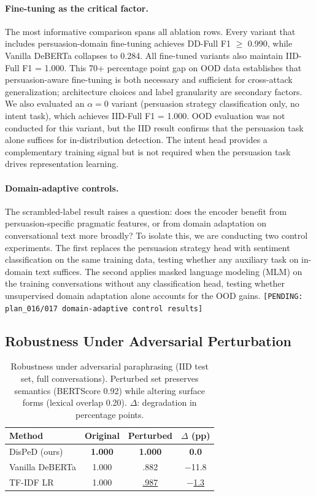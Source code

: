 \paragraph{Fine-tuning as the critical factor.}
The most informative comparison spans all ablation rows.
Every variant that includes persuasion-domain fine-tuning achieves DD-Full F1 $\geq$ 0.990, while Vanilla DeBERTa collapses to 0.284.
All fine-tuned variants also maintain IID-Full F1 = 1.000.
This 70+ percentage point gap on OOD data establishes that persuasion-aware fine-tuning is both necessary and sufficient for cross-attack generalization; architecture choices and label granularity are secondary factors.
We also evaluated an $\alpha=0$ variant (persuasion strategy classification only, no intent task), which achieves IID-Full F1 = 1.000. OOD evaluation was not conducted for this variant, but the IID result confirms that the persuasion task alone suffices for in-distribution detection. The intent head provides a complementary training signal but is not required when the persuasion task drives representation learning.

\paragraph{Domain-adaptive controls.}
The scrambled-label result raises a question: does the encoder benefit from persuasion-specific pragmatic features, or from domain adaptation on conversational text more broadly? To isolate this, we are conducting two control experiments. The first replaces the persuasion strategy head with sentiment classification on the same training data, testing whether any auxiliary task on in-domain text suffices. The second applies masked language modeling (MLM) on the training conversations without any classification head, testing whether unsupervised domain adaptation alone accounts for the OOD gains. \texttt{[PENDING: plan\_016/017 domain-adaptive control results]}

\subsection{Robustness Under Adversarial Perturbation}
\label{sec:perturbation}

\begin{table}[t]
\centering
\small
\caption{Robustness under adversarial paraphrasing (IID test set, full conversations). Perturbed set preserves semantics (BERTScore 0.92) while altering surface forms (lexical overlap 0.20). $\Delta$: degradation in percentage points.}
\label{tab:perturbation}
\begin{tabular}{@{}lccc@{}}
\toprule
\textbf{Method} & Original & Perturbed & $\Delta$ (pp) \\
\midrule
DisPeD (ours) & \textbf{1.000} & \textbf{1.000} & \textbf{0.0} \\
Vanilla DeBERTa & 1.000 & .882 & $-$11.8 \\
TF-IDF LR & 1.000 & \underline{.987} & \underline{$-$1.3} \\
\bottomrule
\end{tabular}
\end{table}

